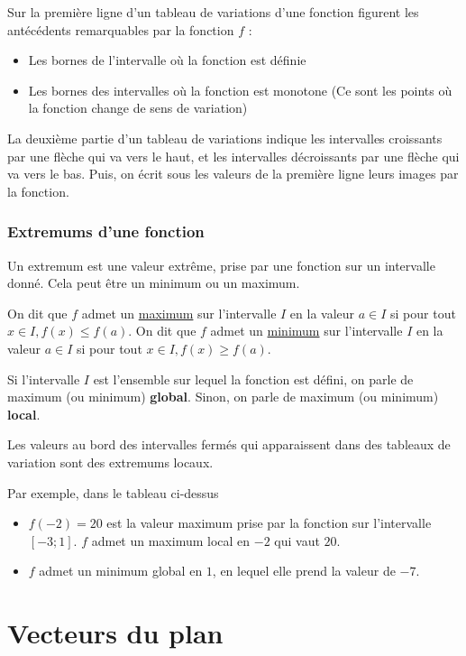 \documentclass[10pt,a4paper,oneside]{book}
\begin{document}
Sur la première ligne d'un tableau de variations d'une fonction figurent les antécédents remarquables par la fonction $f$ :\begin{itemize}
    \item Les bornes de l'intervalle où la fonction est définie
    \item Les bornes des intervalles où la fonction est monotone (Ce sont les points où la fonction change de sens de variation)
\end{itemize}

La deuxième partie d'un tableau de variations indique les intervalles croissants par une flèche qui va vers le haut, et les intervalles décroissants par une flèche qui va vers le bas. Puis, on écrit sous les valeurs de la première ligne leurs images par la fonction.

\subsection{Extremums d'une fonction}

Un extremum est une valeur extrême, prise par une fonction sur un intervalle donné. Cela peut être un minimum ou un maximum.

\begin{de}
    On dit que $f$ admet un \underline{maximum} sur l'intervalle $I$ en la valeur $a \in I$ si pour tout $x \in I,  f(x)\leq f(a)$.
    On dit que $f$ admet un \underline{minimum} sur l'intervalle $I$ en la valeur $a \in I$ si pour tout $x \in I, f(x) \geq f(a)$. 
\end{de}

Si l'intervalle $I$ est l'ensemble sur lequel la fonction est défini, on parle de maximum (ou minimum) \textbf{global}. Sinon, on parle de maximum (ou minimum) \textbf{local}.

Les valeurs au bord des intervalles fermés qui apparaissent dans des tableaux de variation sont des extremums locaux.

Par exemple, dans le tableau ci-dessus\begin{itemize}
    \item 
$f(-2)=20$ est la valeur maximum prise par la fonction sur l'intervalle $[-3;1]$. $f$ admet un maximum local en $-2$ qui vaut $20$. 
\item $f$ admet un minimum global en $1$, en lequel elle prend la valeur de $-7$.
\end{itemize} 

\chapter{Vecteurs du plan}
\end{document}
